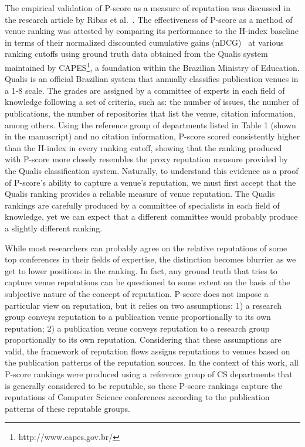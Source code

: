 \documentclass[a4wide,11pt]{article}
\begin{document}
The empirical validation of P-score as a measure of reputation was discussed in the 
research article by Ribas et al.~\cite{Ribas2015}.
The effectiveness of P-score as a method of venue ranking was attested by comparing its
performance to the H-index baseline in terms of their normalized discounted cumulative 
gains (nDCG)~\cite{Jarvelin2002} at various ranking cutoffs using ground truth 
data obtained from the Qualis system maintained by CAPES\footnote{http://www.capes.gov.br/}, 
a foundation within the Brazilian Ministry of Education. Qualis is an official
Brazilian system that annually classifies publication venues in a 1-8 scale. %
The grades are assigned by a committee of experts in each field of knowledge 
following a set of criteria, such as: the number of issues, the number of publications, 
the number of repositories that list the venue, citation information, among others.
Using the reference group of departments listed in Table 1 (shown in the manuscript) and
no citation information, P-score scored consistently higher than the H-index in every 
ranking cutoff, showing that the ranking produced with P-score more closely
resembles the proxy reputation measure provided by the Qualis classification system.
Naturally, to understand this evidence as a proof of P-score's ability to capture a
venue's reputation, we must first accept that the Qualis ranking provides a reliable 
measure of venue reputation. The Qualis rankings are carefully produced by a
committee of specialists in each field of knowledge, yet we can expect
that a different committee would probably produce a slightly different ranking. 

While most researchers can probably agree on the relative reputations of some top conferences 
in their fields of expertise, the distinction becomes blurrier as we get to lower positions in the
ranking. In fact, any ground truth that tries to capture venue reputations can be questioned 
to some extent on the basis of the subjective nature of the concept of reputation. 
P-score does not impose a particular view on reputation, but it relies on two assumptions: 
1) a research group conveys reputation to a publication venue proportionally
to its own reputation; 2) a publication venue conveys reputation to a research group proportionally 
to its own reputation. Considering that these assumptions are valid, the framework of reputation flows 
assigns reputations to venues based on the publication patterns of the reputation sources. 
In the context of this work, all P-score rankings were produced using a reference group 
of CS departments that is generally considered to be reputable, so these P-score rankings capture
the reputations of Computer Science conferences according to the publication patterns of these 
reputable groups.
\\
\end{document}

